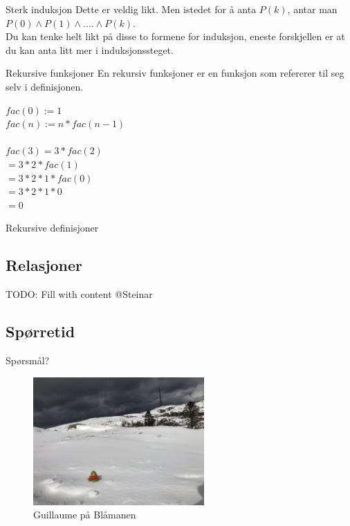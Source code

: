 \begin{frame}{Sterk induksjon}
    Dette er veldig likt. Men istedet for å anta $P(k)$, antar man $P(0) \land P(1) \land .... \land P(k)$.\\
    Du kan tenke helt likt på disse to formene for induksjon, eneste forskjellen er at du kan anta litt mer i induksjonssteget.
\end{frame}

\begin{frame}{Rekursive funksjoner}
    En rekursiv funksjoner er en funksjon som refererer til seg selv i definisjonen.\\
    \begin{block}
        $fac(0) := 1$\\
        $fac(n) := n * fac(n-1)$\\\\
        
        $fac(3) = 3 * fac(2)$\\
        $= 3 * 2 * fac(1)$\\
        $= 3 * 2 * 1 * fac(0)$\\
        $= 3 * 2 * 1 * 0$\\
        $= 0$
    \end{block}
\end{frame}

\begin{frame}{Rekursive definisjoner}
    
\end{frame}

\subsection{Relasjoner}
\begin{frame}
TODO: Fill with content @Steinar 
\end{frame}

\subsection*{Spørretid}
\begin{frame}{Spørsmål?}
    \begin{figure}
        \centering
        \includegraphics[height = 4.9cm]{images/guillaume7.jpg}
        \caption{Guillaume på Blåmanen}
        \label{fig:guillaume7a}
    \end{figure}
\end{frame}

